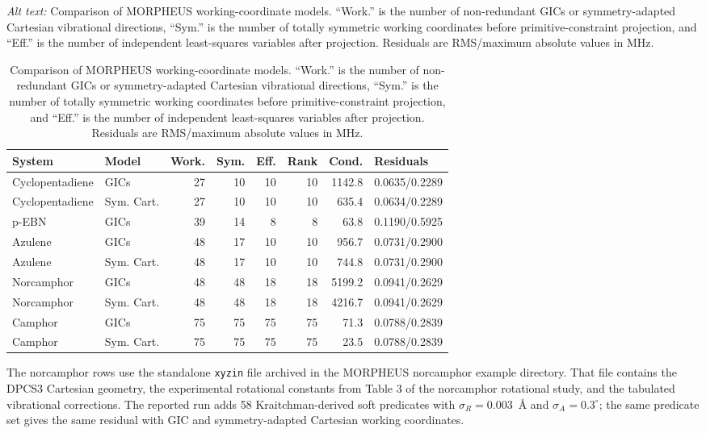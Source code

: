 \documentclass[12pt]{article}
\begin{document}
\begin{table}
\caption{Comparison of MORPHEUS working-coordinate models. ``Work.'' is the number
of non-redundant GICs or symmetry-adapted Cartesian vibrational directions,
``Sym.'' is the number of totally symmetric working coordinates before
primitive-constraint projection, and ``Eff.'' is the number of independent
least-squares variables after projection. Residuals are RMS/maximum absolute
values in MHz.}
\label{tab:si-coordinate-models}
\par\smallskip\noindent\textit{Alt text:} Comparison of MORPHEUS working-coordinate models. ``Work.'' is the number of non-redundant GICs or symmetry-adapted Cartesian vibrational directions, ``Sym.'' is the number of totally symmetric working coordinates before primitive-constraint projection, and ``Eff.'' is the number of independent least-squares variables after projection. Residuals are RMS/maximum absolute values in MHz.
\small
\begin{tabular}{llrrrrrl}
\toprule
System & Model & Work. & Sym. & Eff. & Rank & Cond. & Residuals \\
\midrule
Cyclopentadiene & GICs & 27 & 10 & 10 & 10 & 1142.8 & 0.0635/0.2289 \\
Cyclopentadiene & Sym. Cart. & 27 & 10 & 10 & 10 & 635.4 & 0.0634/0.2289 \\
p-EBN & GICs & 39 & 14 & 8 & 8 & 63.8 & 0.1190/0.5925 \\
Azulene & GICs & 48 & 17 & 10 & 10 & 956.7 & 0.0731/0.2900 \\
Azulene & Sym. Cart. & 48 & 17 & 10 & 10 & 744.8 & 0.0731/0.2900 \\
Norcamphor & GICs & 48 & 48 & 18 & 18 & 5199.2 & 0.0941/0.2629 \\
Norcamphor & Sym. Cart. & 48 & 48 & 18 & 18 & 4216.7 & 0.0941/0.2629 \\
Camphor & GICs & 75 & 75 & 75 & 75 & 71.3 & 0.0788/0.2839 \\
Camphor & Sym. Cart. & 75 & 75 & 75 & 75 & 23.5 & 0.0788/0.2839 \\
\bottomrule
\end{tabular}
\end{table}

The norcamphor rows use the standalone \texttt{xyzin} file archived in the
MORPHEUS norcamphor example directory.  That file contains the DPCS3 Cartesian
geometry, the experimental rotational constants from Table 3 of the
norcamphor rotational study, and the tabulated vibrational corrections.  The
reported run adds 58 Kraitchman-derived soft predicates with
$\sigma_R=0.003$~\AA{} and $\sigma_A=0.3^\circ$; the same predicate set gives
the same residual with GIC and symmetry-adapted Cartesian working coordinates.
\end{document}
